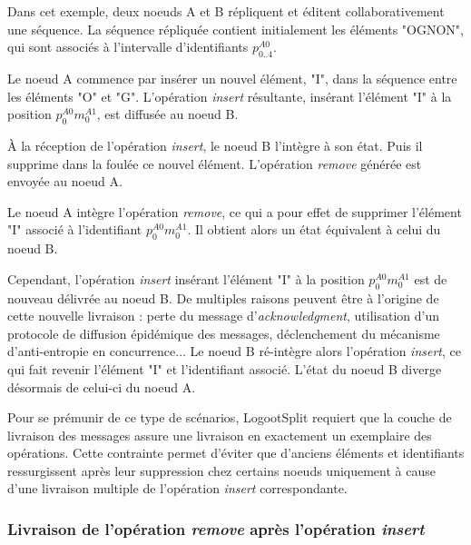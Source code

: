 \documentclass[12pt]{thesul}
\newcommand{\trm}[1]{\mathit{#1}}
\newcommand{\id}[3]{$\trm{#1}^{\trm{#2}}_{\trm{#3}}$}
\begin{document}
Dans cet exemple, deux noeuds A et B répliquent et éditent collaborativement une séquence.
La séquence répliquée contient initialement les éléments "OGNON", qui sont associés à l'intervalle d'identifiants \id{p}{A0}{0..4}.

Le noeud A commence par insérer un nouvel élément, "I", dans la séquence entre les éléments "O" et "G".
L'opération \emph{insert} résultante, insérant l'élément "I" à la position \id{p}{A0}{0}\id{m}{A1}{0}, est diffusée au noeud B.

À la réception de l'opération \emph{insert}, le noeud B l'intègre à son état.
Puis il supprime dans la foulée ce nouvel élément.
L'opération \emph{remove} générée est envoyée au noeud A.

Le noeud A intègre l'opération \emph{remove}, ce qui a pour effet de supprimer l'élément "I" associé à l'identifiant \id{p}{A0}{0}\id{m}{A1}{0}.
Il obtient alors un état équivalent à celui du noeud B.

Cependant, l'opération \emph{insert} insérant l'élément "I" à la position \id{p}{A0}{0}\id{m}{A1}{0} est de nouveau délivrée au noeud B.
De multiples raisons peuvent être à l'origine de cette nouvelle livraison : perte du message d'\emph{acknowledgment}, utilisation d'un protocole de diffusion épidémique des messages, déclenchement du mécanisme d'anti-entropie en concurrence...
Le noeud B ré-intègre alors l'opération \emph{insert}, ce qui fait revenir l'élément "I" et l'identifiant associé.
L'état du noeud B diverge désormais de celui-ci du noeud A.

Pour se prémunir de ce type de scénarios, LogootSplit requiert que la couche de livraison des messages assure une livraison en exactement un exemplaire des opérations.
Cette contrainte permet d'éviter que d'anciens éléments et identifiants ressurgissent après leur suppression chez certains noeuds uniquement à cause d'une livraison multiple de l'opération \emph{insert} correspondante.


\subsubsection{Livraison de l'opération \emph{remove} après l'opération \emph{insert}}
\end{document}
